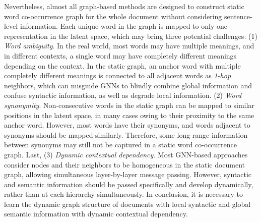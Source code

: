 \documentclass[letterpaper]{article} %
\begin{document}
Nevertheless, almost all graph-based methods are designed to construct static word co-occurrence graph for the whole document without considering sentence-level information.
Each unique word in the graph is mapped to only one representation in the latent space, which may bring three potential challenges: (1) \textit{Word ambiguity}. In the real world, most words may have multiple meanings, and in different contexts, a single word may have completely different meanings depending on the context.
In the static graph, an anchor word with multiple completely different meanings is connected to all adjacent words as \textit{1-hop} neighbors, which can misguide GNNs to blindly combine global information and confuse syntactic information, as well as degrade local information.
(2) \textit{Word synonymity}. Non-consecutive words in the static graph can be mapped to similar positions in the latent space, in many cases owing to their proximity to the same anchor word.
However, most words have their synonyms, and words adjacent to synonyms should be mapped similarly. Therefore, some long-range information between synonyms may still not be captured in a static word co-occurrence graph.
Last, (3) \textit{Dynamic contextual dependency}.
Most GNN-based approaches consider nodes and their neighbors to be homogeneous in the static document graph, allowing simultaneous layer-by-layer message passing.
However, syntactic and semantic information should be passed specifically and develop dynamically, rather than at each hierarchy simultaneously.
In conclusion, it is necessary to learn the dynamic graph structure of documents with local syntactic and global semantic information with dynamic contextual dependency.
\end{document}
